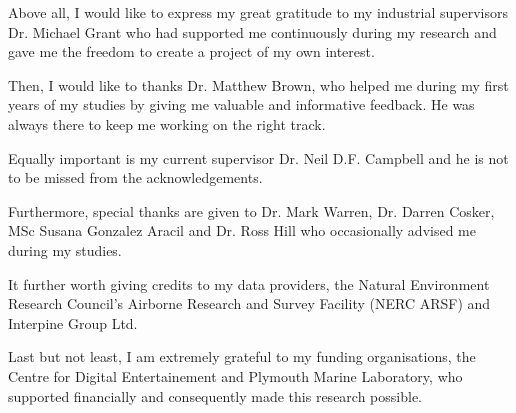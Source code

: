 \documentclass{subfiles}
\begin{document}
	\par Above all, I would like to express my great gratitude to my industrial supervisors Dr. Michael Grant who had supported me continuously during my research and gave me the freedom to create a project of my own interest.
	
	\par Then, I would like to thanks Dr. Matthew Brown, who helped me during my first years of my studies by giving me valuable and informative feedback. He was always there to keep me working on the right track. 
	
	\par Equally important is my current supervisor Dr. Neil D.F. Campbell and he is not to be missed from the acknowledgements.
	
	\par Furthermore, special thanks are given to Dr. Mark Warren, Dr. Darren Cosker, MSc Susana Gonzalez Aracil and Dr. Ross Hill who occasionally advised me during my studies. 
	
	\par It further worth giving credits to my data providers, the Natural Environment Research Council’s Airborne Research and Survey Facility (NERC ARSF) and Interpine Group Ltd. 
	
	\par Last but not least, I am extremely grateful to my funding organisations, the Centre for Digital Entertainement and Plymouth Marine Laboratory, who supported financially and consequently made this research possible. 
	

	
\end{document}
